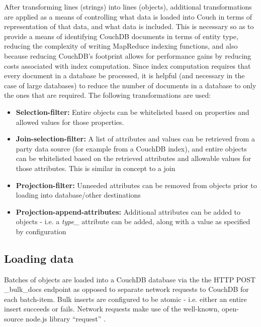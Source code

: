 After transforming lines (strings) into lines (objects), additional transformations are applied as a means of controlling what data is loaded into Couch in terms of representation of that data, and what data is included. This is necessary so as to provide a means of identifying CouchDB documents in terms of entity type, reducing the complexity of writing MapReduce indexing functions, and also because reducing CouchDB's footprint allows for performance gains by reducing costs associated with index computation. Since index computation requires that every document in a database be processed, it is helpful (and necessary in the case of large databases) to reduce the number of documents in a database to only the ones that are required. The following transformations are used:

\begin{itemize}
    \item \textbf{Selection-filter:} Entire objects can be whitelisted based on properties and allowed values for those properties.
    \item \textbf{Join-selection-filter:} A list of attributes and values can be retrieved from a  party data source (for example from a CouchDB index), and entire objects can be whitelisted based on the retrieved attributes and allowable values for those attributes. This is similar in concept to a join
    \item \textbf{Projection-filter:} Unneeded attributes can be removed from objects prior to loading into database/other destinations
    \item \textbf{Projection-append-attributes:} Additional attributes can be added to objects - i.e. a \textit{type\_} attribute can be added, along with a value as specified by configuration
\end{itemize}

\subsection{Loading data}
Batches of objects are loaded into a CouchDB database via the the HTTP POST \_bulk\_docs endpoint as opposed to separate network requests to CouchDB for each batch-item. Bulk inserts are configured to be atomic - i.e. either an entire insert succeeds or fails. Network requests make use of the well-known, open-source node.js library ``request'' \cite{request-lib}.